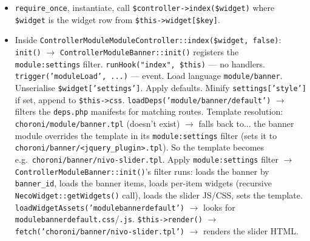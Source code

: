 \documentclass[11pt,a4paper]{article}
\begin{document}
\begin{enumerate}[leftmargin=1.6em,itemsep=2pt]
\begin{itemize}[itemsep=2pt]
\begin{itemize}[itemsep=2pt]
                  \item \texttt{require\_once}, instantiate, call
                        \texttt{\$controller->index(\$widget)} where
                        \texttt{\$widget} is the widget row from
                        \texttt{\$this->widget[\$key]}.
                  \item Inside
                        \texttt{ControllerModuleModuleController::index(\$widget, false)}:
                        \texttt{init()} $\to$
                        \texttt{ControllerModuleBanner::init()}
                        registers the \texttt{module:settings}
                        filter. \texttt{runHook("index", \$this)}
                        --- no handlers.
                        \texttt{trigger('moduleLoad', ...)} ---
                        event. Load language
                        \texttt{module/banner}. Unserialise
                        \texttt{\$widget['settings']}. Apply
                        defaults. Minify \texttt{settings['style']}
                        if set, append to \texttt{\$this->css}.
                        \texttt{loadDeps('module/banner/default')}
                        $\to$ filters the \texttt{deps.php}
                        manifests for matching routes. Template
                        resolution: \texttt{choroni/module/banner.tpl}
                        (doesn't exist) $\to$ falls back to...
                        the banner module overrides the template
                        in its \texttt{module:settings} filter
                        (sets it to
                        \texttt{choroni/banner/<jquery\_plugin>.tpl}).
                        So the template becomes e.g.\
                        \texttt{choroni/banner/nivo-slider.tpl}.
                        Apply \texttt{module:settings} filter $\to$
                        \texttt{ControllerModuleBanner::init()}'s
                        filter runs: loads the banner by
                        \texttt{banner\_id}, loads the banner
                        items, loads per-item widgets (recursive
                        \texttt{NecoWidget::getWidgets()} call),
                        loads the slider JS/CSS, sets the template.
                        \texttt{loadWidgetAssets('modulebannerdefault')}
                        $\to$ looks for
                        \texttt{modulebannerdefault.css}/\texttt{.js}.
                        \texttt{\$this->render()} $\to$
                        \texttt{fetch('choroni/banner/nivo-slider.tpl')}
                        $\to$ renders the slider HTML.
                \end{itemize}

\end{itemize}
\end{enumerate}
\end{document}
